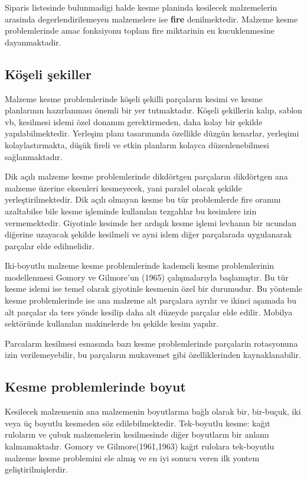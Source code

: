 \documentclass[]{book}
\begin{document}
Siparis listesinde bulunmadigi halde kesme planinda kesilecek malzemelerin arasinda degerlendirilemeyen malzemelere ise \textbf{fire} denilmektedir. Malzeme kesme problemlerinde amac fonksiyonu toplam fire miktarinin en kucuklenmesine dayanmaktadir.

\hypertarget{koseli-sekiller}{%
\subsection{Köşeli şekiller}\label{koseli-sekiller}}

Malzeme kesme problemlerinde köşeli şekilli parçaların kesimi ve kesme planlarının hazırlanması önemli bir yer tutmaktadır. Köşeli şekillerin kalıp, sablon vb, kesilmesi islemi özel donanım gerektirmeden, daha kolay bir şekilde yapılabilmektedir. Yerleşim planı tasarımında özellikle düzgün kenarlar, yerleşimi kolaylastırmakta, düşük fireli ve etkin planların kolayca düzenlenebilmesi sağlanmaktadır.

Dik açılı malzeme kesme problemlerinde dikdörtgen parçaların dikdörtgen ana malzeme üzerine eksenleri kesmeyecek, yani paralel olacak şekilde yerleştirilmektedir. Dik açılı olmayan kesme bu tür problemlerde fire oranını azaltabilse bile kesme işleminde kullanılan tezgahlar bu kesimlere izin vermemektedir. Giyotinle kesimde her ardışık kesme işlemi levhanın bir ucundan diğerine uzayacak şekilde kesilmeli ve ayni islem diğer parçalarada uygulanarak parçalar elde edilmelidir.

Iki-boyutlu malzeme kesme problemlerinde kademeli kesme problemlerinin modellenmesi Gomory ve Gilmore'un (1965) çalışmalarıyla başlamıştır. Bu tür kesme islemi ise temel olarak giyotinle kesmenin özel bir durumudur. Bu yöntemle kesme problemlerinde ise ana malzeme alt parçalara ayrılır ve ikinci aşamada bu alt parçalar da ters yönde kesilip daha alt düzeyde parçalar elde edilir. Mobilya sektöründe kullanılan makinelerde bu şekilde kesim yapılır.

Parcaların kesilmesi esnasında bazı kesme problemlerinde parçalarin rotasyonuna izin verilemeyebilir, bu parçaların mukavemet gibi özelliklerinden kaynaklanabilir.

\hypertarget{kesme-problemlerinde-boyut}{%
\subsection{Kesme problemlerinde boyut}\label{kesme-problemlerinde-boyut}}

Kesilecek malzemenin ana malzemenin boyutlarına bağlı olarak bir, bir-buçuk, iki veya üç boyutlu kesmeden söz edilebilmektedir.
Tek-boyutlu kesme: kağıt ruloların ve çubuk malzemelerin kesilmesinde diğer boyutların bir anlamı kalmamaktadır. Gomory ve Gilmore(1961,1963) kağıt rulolara tek-boyutlu malzeme kesme problemini ele almış ve en iyi sonucu veren ilk yontem geliştirilmişlerdir.
\end{document}
